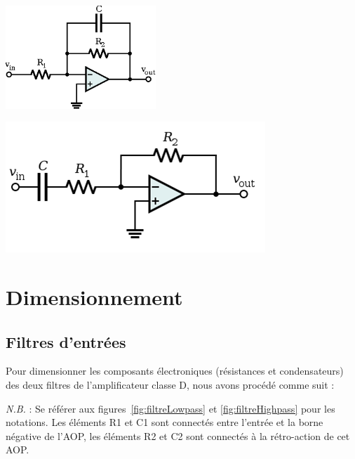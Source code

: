 \documentclass[10pt, oneside, a4paper]{article}
\begin{document}
\begin{minipage}[t]{.475\textwidth}
    \centering
    \includegraphics[height=110pt]{eps/active-lowpass-filter-rc.eps}
    \label{fig:filtreLowpass}
\end{minipage} \hfill
\begin{minipage}[t]{.475\textwidth}
    \centering
    \includegraphics[width=\textwidth]{image/active-highpass-filter-rc.png}
    \label{fig:filtreHighpass}
\end{minipage}


\section{Dimensionnement}

\subsection{Filtres d'entrées}
    \label{sec:filtrePreAmpli}
Pour dimensionner les composants électroniques (résistances et condensateurs) des deux filtres de l'amplificateur classe D, nous avons procédé comme suit :

\textit{N.B.} : Se référer aux figures~\ref{fig:filtreLowpass} et \ref{fig:filtreHighpass} pour les notations.
Les éléments R1 et C1 sont connectés entre l'entrée et la borne négative de l'AOP, les éléments R2 et C2 sont connectés à la rétro-action de cet AOP.
\end{document}
